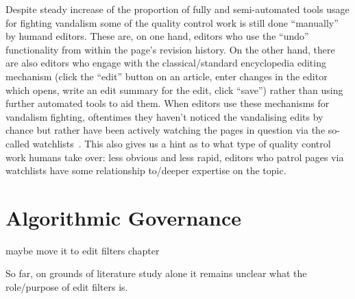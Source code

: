 Despite steady increase of the proportion of fully and semi-automated tools usage for fighting vandalism %
some of the quality control work is still done ``manually'' by humand editors.
These are, on one hand, editors who use the ``undo'' functionality from within the page's revision history.
On the other hand, there are also editors who engage with the classical/standard encyclopedia editing mechanism (click the ``edit'' button on an article, enter changes in the editor which opens, write an edit summary for the edit, click ``save'') rather than using further automated tools to aid them.
When editors use these mechanisms for vandalism fighting, oftentimes they haven't noticed the vandalising edits by chance but rather have been actively watching the pages in question via the so-called watchlists~\cite{AstHal2018}.
This also gives us a hint as to what type of quality control work humans take over: less obvious and less rapid, editors who patrol pages via watchlists have some relationship to/deeper expertise on the topic. %



\section{Algorithmic Governance}

maybe move it to edit filters chapter


So far, on grounds of literature study alone it remains unclear what the role/purpose of edit filters is.
